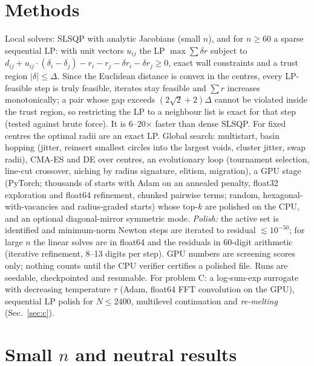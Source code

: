 \documentclass[10pt]{article}
\begin{document}
\section{Methods}
Local solvers: SLSQP with analytic Jacobians (small $n$), and for $n\ge60$ a sparse sequential LP: with unit vectors $u_{ij}$ the LP $\max\sum\delta r$ subject to
$d_{ij}+u_{ij}\cdot(\delta_i-\delta_j)-r_i-r_j-\delta r_i-\delta r_j\ge0$, exact wall constraints and a trust region $|\delta|\le\Delta$. Since the Euclidean distance is convex in the centres,
every LP-feasible step is truly feasible, iterates stay feasible and $\sum r$ increases monotonically; a pair whose gap exceeds $(2\sqrt2+2)\Delta$ cannot be violated inside the trust region, so
restricting the LP to a neighbour list is exact for that step (tested against brute force). It is 6--20$\times$ faster than dense SLSQP. For fixed centres the optimal radii are an exact LP.
Global search: multistart, basin hopping (jitter, reinsert smallest circles into the largest voids, cluster jitter, swap radii), CMA-ES and DE over centres, an evolutionary loop (tournament selection, line-cut
crossover, niching by radius signature, elitism, migration), a GPU stage (PyTorch; thousands of starts with Adam on an annealed penalty, float32 exploration and float64 refinement, chunked pairwise terms; random, hexagonal-with-vacancies
and radius-graded starts) whose top-$k$ are polished on the CPU, and an optional diagonal-mirror symmetric mode. \emph{Polish:} the active set is identified and minimum-norm Newton steps are iterated to residual $\lesssim10^{-50}$;
for large $n$ the linear solves are in float64 and the residuals in 60-digit arithmetic (iterative refinement, 8--13 digits per step). GPU numbers are screening scores only; nothing counts until the CPU verifier certifies a polished file.
Runs are seedable, checkpointed and resumable. For problem C: a log-sum-exp surrogate with decreasing temperature $\tau$ (Adam, float64 FFT convolution on the GPU), sequential LP polish for $N\le2400$, multilevel continuation and \emph{re-melting} (Sec.~\ref{sec:c}).

\section{Small $n$ and neutral results}\label{sec:small}
\end{document}
